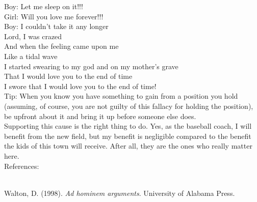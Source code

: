 \documentclass[a4paper,12pt,single,pdftex]{scrartcl}
\begin{document}
    
      Boy: Let me sleep on it!!!
    \\

    
      Girl: Will you love me forever!!!
    \\

    
      Boy: I couldn't take it any longer
    \\

    
      Lord, I was crazed
    \\

    
      And when the feeling came upon me
    \\

    
      Like a tidal wave
    \\

    
      I started swearing to my god and on my mother's grave
    \\

    
      That I would love you to the end of time
    \\

    
      I swore that I would love you to the end of time!
    \\

    
      Tip: When you know you have something to gain from a position you hold (assuming, of course, you are not guilty of this fallacy for holding the position), be upfront about it and bring it up before someone else does.
    \\

    
      Supporting this cause is the right thing to do.  Yes, as the baseball coach, I will benefit from the new field, but my benefit is negligible compared to the benefit the kids of this town will receive.  After all, they are the ones who really matter here.
    \\

    References:

    
      
        
      \\

      
        
          Walton, D. (1998). {\it Ad hominem arguments}. University of Alabama Press.
        
      
    
\end{document}
